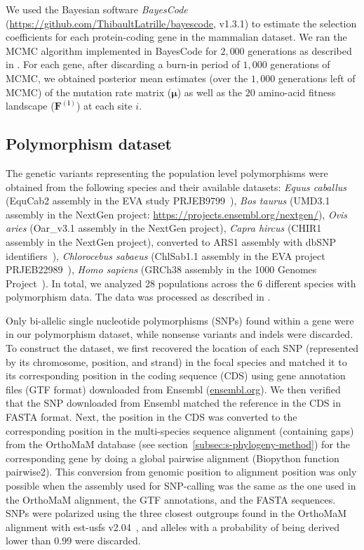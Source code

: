 \documentclass{article}
\newcommand{\UniDimArray}[1]{\bm{#1}}
\begin{document}
    We used the Bayesian software \textit{BayesCode} (\url{https://github.com/ThibaultLatrille/bayescode}, v1.3.1) to estimate the selection coefficients for each protein-coding gene in the mammalian dataset.
    We ran the MCMC algorithm implemented in BayesCode for $2,000$ generations as described in \textcite{latrille_genes_2023}.
    For each gene, after discarding a burn-in period of $1,000$ generations of MCMC, we obtained posterior mean estimates (over the $1,000$ generations left of MCMC) of the mutation rate matrix ($\UniDimArray{\mu}$) as well as the $20$ amino-acid fitness landscape ($\UniDimArray{F^{(i)}}$) at each site $i$.

    \subsection{Polymorphism dataset}
    \label{subsec:polymorphism-dataset}

    The genetic variants representing the population level polymorphisms were obtained from the following species and their available datasets: \textit{Equus caballus} (EquCab2 assembly in the EVA study PRJEB9799~\cite{alabri_whole_2020}), \textit{Bos taurus} (UMD3.1 assembly in the NextGen project: \url{https://projects.ensembl.org/nextgen/}), \textit{Ovis aries} (Oar\_v3.1 assembly in the NextGen project), \textit{Capra hircus} (CHIR1 assembly in the NextGen project), converted to ARS1 assembly with dbSNP identifiers~\cite{sherry_dbsnp_2001}), \textit{Chlorocebus sabaeus} (ChlSab1.1 assembly in the EVA project PRJEB22989~\cite{svardal_ancient_2017}), \textit{Homo sapiens} (GRCh38 assembly in the 1000 Genomes Project~\cite{zheng-bradley_alignment_2017}).
    In total, we analyzed 28 populations across the 6 different species with polymorphism data.
    The data was processed as described in \textcite{latrille_genes_2023}.

    Only bi-allelic single nucleotide polymorphisms (SNPs) found within a gene were in our polymorphism dataset, while nonsense variants and indels were discarded.
    To construct the dataset, we first recovered the location of each SNP (represented by its chromosome, position, and strand) in the focal species and matched it to its corresponding position in the coding sequence (CDS) using gene annotation files (GTF format) downloaded from Ensembl (\url{ensembl.org}).
    We then verified that the SNP downloaded from Ensembl matched the reference in the CDS in FASTA format.
    Next, the position in the CDS was converted to the corresponding position in the multi-species sequence alignment (containing gaps) from the OrthoMaM database (see section~\ref{subsec:s-phylogeny-method}) for the corresponding gene by doing a global pairwise alignment (Biopython function pairwise2).
    This conversion from genomic position to alignment position was only possible when the assembly used for SNP-calling was the same as the one used in the OrthoMaM alignment, the GTF annotations, and the FASTA sequences.
    SNPs were polarized using the three closest outgroups found in the OrthoMaM alignment with est-usfs v2.04~\cite{keightley_inferring_2018}, and alleles with a probability of being derived lower than 0.99 were discarded.
\end{document}
